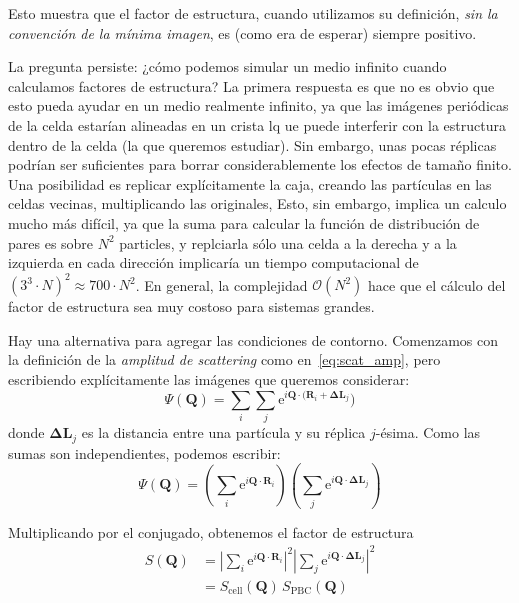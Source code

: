 Esto muestra que el factor de estructura, cuando utilizamos su definición, \emph{sin la convención de la mínima imagen}, es (como era de esperar) siempre positivo.

La pregunta persiste: ¿cómo podemos simular un medio infinito cuando calculamos factores de estructura?
La primera respuesta es que no es obvio que esto pueda ayudar en un medio realmente infinito, ya que las imágenes periódicas de la celda estarían alineadas en un crista lq ue puede interferir con la estructura dentro de la celda (la que queremos estudiar).
Sin embargo, unas pocas réplicas podrían ser suficientes para borrar considerablemente los efectos de tamaño finito.
Una posibilidad es replicar explícitamente la caja, creando las partículas en las celdas vecinas, multiplicando las originales,
Esto, sin embargo, implica un calculo mucho más difícil, ya que la suma para calcular la función de distribución de pares es sobre $N^2$ particles, y replciarla sólo una celda a la derecha y a la izquierda en cada dirección implicaría un tiempo computacional de  $(3^3\cdot N)^2 \approx 700\cdot N^2$.
En general, la complejidad $\mathcal{O}(N^2)$ hace que el cálculo del factor de estructura sea muy costoso para sistemas grandes.

Hay una alternativa para agregar las condiciones de contorno.
Comenzamos con la definición de la \emph{amplitud de scattering} como en~\ref{eq:scat_amp}, pero escribiendo explícitamente las imágenes que queremos considerar:
\begin{equation}
  \Psi(\mathbf{Q}) = \sum_i \sum_j
  \text{e}^{i\mathbf{Q}\cdot(\mathbf{R}_i+\mathbf{\Delta L}_j})
\end{equation}
donde $\mathbf{\Delta L}_j$ es la distancia entre una partícula y su réplica
$j$-ésima. Como las sumas son independientes, podemos escribir:
\begin{equation}
  \Psi(\mathbf{Q}) = \left(\sum_i
    \text{e}^{i\mathbf{Q}\cdot\mathbf{R}_i}\right)
  \left(\sum_j\text{e}^{i\mathbf{Q}\cdot\mathbf{\Delta L}_j}\right)
\end{equation}

Multiplicando por el conjugado, obtenemos el factor de estructura
\begin{align}
  S(\mathbf{Q}) &= \left|\sum_i
    \text{e}^{i\mathbf{Q}\cdot\mathbf{R}_i}\right|^2 \left|\sum_j
    \text{e}^{i\mathbf{Q}\cdot\mathbf{\Delta L}_j}\right|^2\\
  &= S_{\text{cell}}(\mathbf{Q})\,S_{\text{PBC}}(\mathbf{Q})
\end{align}

